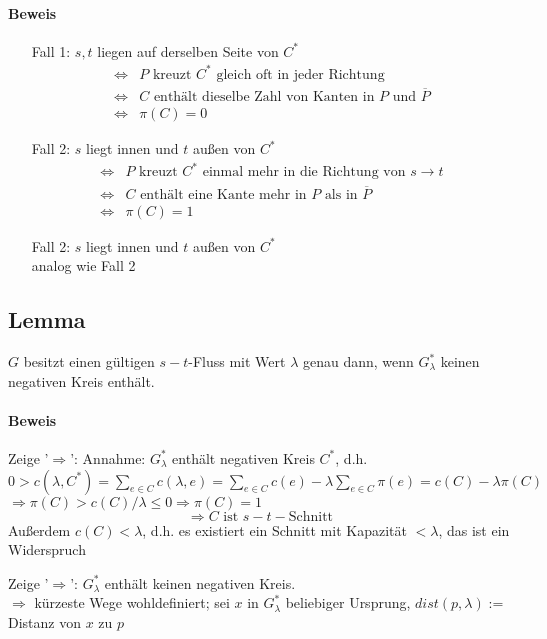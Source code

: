 \documentclass{article}
\begin{document}
\paragraph{Beweis}
\begin{enumerate}
	\item[Fall 1:] $s,t$ liegen auf derselben Seite von $C^*$
	\begin{align*}
	\Longleftrightarrow & P \text{ kreuzt } C^* \text{ gleich oft in jeder Richtung}\\
	\Longleftrightarrow & C \text{ enthält dieselbe Zahl von Kanten in }P \text{ und }\overline{P}\\
	\Longleftrightarrow & \pi(C) = 0
	\end{align*}
		\item[Fall 2:] $s$ liegt innen und $t$ außen von $C^*$
		\begin{align*}
		\Longleftrightarrow & P \text{ kreuzt } C^* \text{ einmal mehr in die Richtung von }s\rightarrow t\\
		\Longleftrightarrow & C \text{ enthält eine Kante mehr in }P \text{ als in }\overline{P}\\
		\Longleftrightarrow & \pi(C) = 1
		\end{align*}
			\item[Fall 2:] $s$ liegt innen und $t$ außen von $C^*$\\
			analog wie Fall 2
\end{enumerate}

\subsection{Lemma}
$G$ besitzt einen gültigen $s-t$-Fluss mit Wert $\lambda$ genau dann, wenn $G^*_\lambda$ keinen negativen Kreis enthält.

\paragraph{Beweis}
Zeige '$\Longrightarrow$': Annahme: $G^*_\lambda$ enthält negativen Kreis $C^*$, d.h.
$0 >c(\lambda, C^*) = \sum_{e \in C}c(\lambda,e)= \sum_{e\in C}c(e) - \lambda \sum_{e\in C}\pi(e) = c(C) - \lambda \pi(C)$
$\Longrightarrow \pi(C)  > c(C)/ \lambda \leq 0 \Longrightarrow \pi(C) = 1$
\[\Longrightarrow C \text{ ist } s-t-\text{Schnitt}\]
Außerdem $c(C) < \lambda$, d.h. es existiert ein Schnitt mit Kapazität $< \lambda$, das ist ein Widerspruch

Zeige '$\Longrightarrow$': $G_\lambda^*$ enthält keinen negativen Kreis.\\
$\Longrightarrow$ kürzeste Wege wohldefiniert;
sei $x$ in $G^*_\lambda$ beliebiger Ursprung, $dist(p,\lambda) := $ Distanz von $x$ zu $p$
\end{document}
